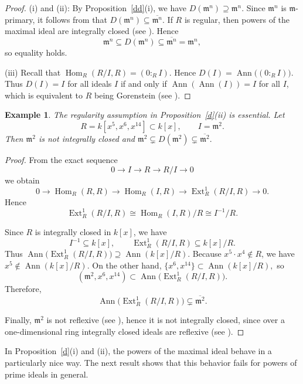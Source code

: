 \documentclass[11pt,a4paper]{amsart}
\numberwithin{equation}{section}
\newtheorem{example}[theorem]{Example}
\DeclareMathOperator{\Ann}{Ann}\DeclareMathOperator{\ann}{Ann}
\DeclareMathOperator{\Ext}{Ext}
\DeclareMathOperator{\Hom}{Hom}
\newcommand{\fm}{\mathfrak{m}}
\begin{document}
\begin{proof}
	(i) and (ii): By Proposition~\ref{dd}(i), we have $D(\fm^n)\supseteq \fm^n$. Since $\fm^n$ is $\fm$-primary, it follows from \cite[2.15]{corso} that
	\(
	D(\fm^n)\subseteq\overline{\fm^n}.
	\)
	If $R$ is regular, then powers of the maximal ideal are integrally closed (see \cite[Ex.~1.18]{HS}). Hence
	\[
	\fm^n \subseteq D(\fm^n) \subseteq \overline{\fm^n}=\fm^n,
	\]
	so equality holds.
	
	(iii) Recall that $\Hom_R(R/I,R)=(0:_R I)$. Hence
	\(
	D(I)=\Ann\big((0:_R I)\big).
	\)
	Thus $D(I)=I$ for all ideals $I$ if and only if $\Ann(\Ann(I))=I$ for all $I$, which is equivalent to $R$ being Gorenstein (see \cite[Ex.~3.2.15]{BH}).
\end{proof}


\begin{example}\label{ex1}
	The regularity assumption in Proposition~\ref{d}(ii) is essential.
Let
	\[
	R = k[x^5,x^6,x^{14}] \subset k[x], 
	\qquad I=\fm^2.
	\]
	Then $\fm^2$ is not integrally closed and
	\(
	\fm^2 \subsetneq D(\fm^2) \subsetneq \overline{\fm^2}.
	\)
\end{example}

\begin{proof}
	From the exact sequence
	\[
	0 \longrightarrow I \longrightarrow R \longrightarrow R/I \longrightarrow 0
	\]
	we obtain
	\[
	0 \longrightarrow \Hom_R(R,R)
	\longrightarrow \Hom_R(I,R)
	\longrightarrow \Ext^1_R(R/I,R)
	\longrightarrow 0.
	\]
	Hence
	\[
	\Ext^1_R(R/I,R)
	\cong \Hom_R(I,R)/R
	\cong I^{-1}/R.
	\]
	
	Since $R$ is integrally closed in $k[x]$, we have
	\[
	I^{-1} \subseteq k[x],
	\qquad
	\Ext^1_R(R/I,R)\subseteq k[x]/R.
	\]
	Thus
	\(
	\Ann\!\big(\Ext^1_R(R/I,R)\big) \supseteq \Ann(k[x]/R).
	\) Because $x^5\cdot x^4 \notin R$, we have $x^5 \notin \Ann(k[x]/R)$. On the other hand,
	\( 
	\{x^6,x^{14}\} \subset \Ann(k[x]/R),
	\)
	so
	\[
	(\fm^2,x^6,x^{14}) \subset \Ann\!\big(\Ext^1_R(R/I,R)\big).
	\]
	Therefore,
	\[
	\Ann\!\big(\Ext^1_R(R/I,R)\big) \subsetneq \overline{\fm^2}.
	\]
	
	Finally, $\fm^2$ is not reflexive (see \cite[7.5]{dao}), hence it is not integrally closed, since over a one-dimensional ring integrally closed ideals are reflexive (see \cite[2.14]{corso}).
\end{proof}
In Proposition~\ref{d}(i) and (ii), the powers of the maximal ideal behave in a particularly nice way. The next result shows that this behavior fails for powers of prime ideals in general.
\end{document}
